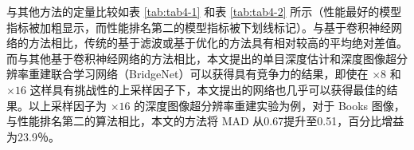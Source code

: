 	与其他方法的定量比较如表 \ref{tab:tab4-1} 和表 \ref{tab:tab4-2} 所示（性能最好的模型指标被加粗显示，而性能排名第二的模型指标被下划线标记）。与基于卷积神经网络的方法相比，传统的基于滤波或基于优化的方法具有相对较高的平均绝对差值。而与其他基于卷积神经网络的方法相比，本文提出的单目深度估计和深度图像超分辨率重建联合学习网络（BridgeNet）可以获得具有竞争力的结果，即使在 $\times 8$ 和 $\times 16$ 这样具有挑战性的上采样因子下，本文提出的网络也几乎可以获得最佳的结果。以上采样因子为 $\times 16$ 的深度图像超分辨率重建实验为例，对于 Books 图像，与性能排名第二的算法相比，本文的方法将 MAD 从0.67提升至0.51，百分比增益为23.9％。
	
